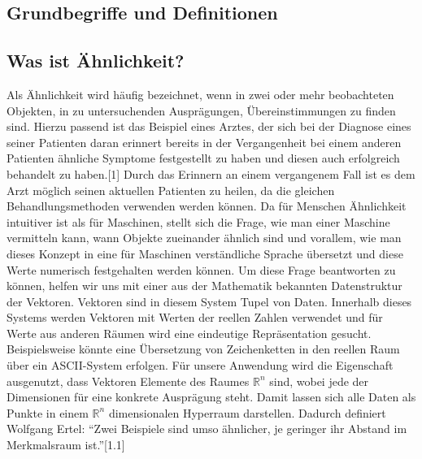 \documentclass[a4paper]{scrartcl}
\begin{document}
\begin{multicols}{2}
                        \section{Grundbegriffe und Definitionen}
                        \subsection{Was ist Ähnlichkeit?}
                        Als Ähnlichkeit wird häufig bezeichnet, wenn in zwei oder mehr beobachteten Objekten, in zu untersuchenden Ausprägungen, Übereinstimmungen zu finden sind. 
                        Hierzu passend ist das Beispiel eines Arztes, der sich bei der Diagnose eines seiner Patienten daran erinnert bereits in der Vergangenheit bei einem anderen Patienten ähnliche Symptome festgestellt zu haben und diesen auch erfolgreich behandelt zu haben.[1] Durch das Erinnern an einem vergangenem Fall ist es dem Arzt möglich seinen aktuellen Patienten zu heilen, da die gleichen Behandlungsmethoden verwenden werden können.
                        Da für Menschen Ähnlichkeit intuitiver ist als für Maschinen, stellt sich die Frage, wie man einer Maschine vermitteln kann, wann Objekte zueinander ähnlich sind und vorallem, wie man dieses Konzept in eine für Maschinen verständliche Sprache übersetzt und diese Werte numerisch festgehalten werden können.
                        Um diese Frage beantworten zu können, helfen wir uns mit einer aus der Mathematik bekannten Datenstruktur der Vektoren.
                        Vektoren sind in diesem System Tupel von Daten. Innerhalb dieses Systems werden Vektoren mit Werten der reellen Zahlen verwendet und für Werte aus anderen Räumen wird eine eindeutige Repräsentation gesucht. Beispielsweise könnte eine Übersetzung von Zeichenketten in den reellen Raum über ein ASCII-System erfolgen. 
                        Für unsere Anwendung wird die Eigenschaft ausgenutzt, dass Vektoren Elemente des Raumes $\mathbb{R}^n$ sind, wobei jede der Dimensionen für eine konkrete Ausprägung steht. Damit lassen sich alle Daten als Punkte in einem $\mathbb{R}^n$ dimensionalen Hyperraum darstellen. Dadurch definiert Wolfgang Ertel: “Zwei Beispiele sind umso ähnlicher, je geringer ihr Abstand im Merkmalsraum ist.”[1.1] 

\end{multicols}
\end{document}
